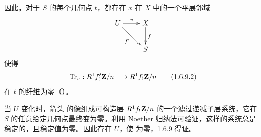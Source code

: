 因此，对于 $S$ 的每个几何点 $t$，都存在 $x$ 在 $X$ 中的一个平展邻域
$$
\xymatrix{
U \ar[r]^{v} \ar[rd]_{f'}& X \ar[d]^{f}\\
  & S
}
$$
使得
\begin{equation*}
\operatorname{Tr}_{v}:R^{1}f'_{!}\mathbf{Z}/n\longrightarrow
R^{1}f_{!}\mathbf{Z}/n\tag{1.6.9.2}
\end{equation*}%
在 $t$ 的纤维为零（）。

当 $U$ 变化时，箭头  的像组成可构造层 $R^{1}f_{!}\mathbf{Z}/n$ 的一个滤过递减子层系统，它在 $S$ 的任意给定几何点最终变为零。利用 Noether 归纳法可验证，这样的系统总是稳定的，且稳定值为零。因此存在 $U$，使  为零，\hyperref[XVIII.lemfond1.6.9]{1.6.9} 得证。
